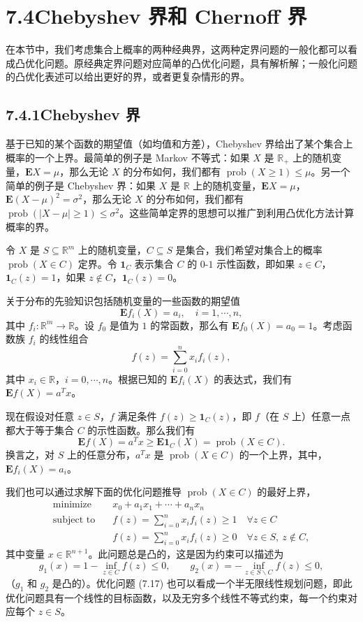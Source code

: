 \documentclass[UTF8,12pt,a4paper,fontset=fandol]{ctexart}
\begin{document}
\section*{7.4\quad Chebyshev 界和 Chernoff 界}

在本节中，我们考虑集合上概率的两种经典界，这两种定界问题的一般化都可以看成凸优化问题。原经典定界问题对应简单的凸优化问题，具有解析解；一般化问题的凸优化表述可以给出更好的界，或者更复杂情形的界。

\subsection*{7.4.1\quad Chebyshev 界}

基于已知的某个函数的期望值（如均值和方差），Chebyshev 界给出了某个集合上概率的一个上界。最简单的例子是 Markov 不等式：如果 $X$ 是 $\mathbb{R}_+$ 上的随机变量，$\mathbf{E}X=\mu$，那么无论 $X$ 的分布如何，我们都有 $\operatorname{prob}(X\geq 1)\leq \mu$。另一个简单的例子是 Chebyshev 界：如果 $X$ 是 $\mathbb{R}$ 上的随机变量，$\mathbf{E}X=\mu$，$\mathbf{E}(X-\mu)^2=\sigma^2$，那么无论 $X$ 的分布如何，我们都有 $\operatorname{prob}(|X-\mu|\geq 1)\leq\sigma^2$。这些简单定界的思想可以推广到利用凸优化方法计算概率的界。

令 $X$ 是 $S\subseteq\mathbb{R}^m$ 上的随机变量，$C\subseteq S$ 是集合，我们希望对集合上的概率 $\operatorname{prob}(X\in C)$ 定界。令 $\mathbf{1}_C$ 表示集合 $C$ 的 $0$-$1$ 示性函数，即如果 $z\in C$，$\mathbf{1}_C(z)=1$，如果 $z\notin C$，$\mathbf{1}_C(z)=0$。

关于分布的先验知识包括随机变量的一些函数的期望值
\[
\mathbf{E}f_i(X)=a_i,\quad i=1,\cdots,n,
\]
其中 $f_i:\mathbb{R}^m\to\mathbb{R}$。设 $f_0$ 是值为 $1$ 的常函数，那么有 $\mathbf{E}f_0(X)=a_0=1$。考虑函数族 $f_i$ 的线性组合
\[
f(z)=\sum_{i=0}^n x_if_i(z),
\]
其中 $x_i\in\mathbb{R}$，$i=0,\cdots,n$。根据已知的 $\mathbf{E}f_i(X)$ 的表达式，我们有 $\mathbf{E}f(X)=a^Tx$。

现在假设对任意 $z\in S$，$f$ 满足条件 $f(z)\geq \mathbf{1}_C(z)$，即 $f$（在 $S$ 上）任意一点都大于等于集合 $C$ 的示性函数。那么我们有
\[
\mathbf{E}f(X)=a^Tx\geq \mathbf{E}\mathbf{1}_C(X)=\operatorname{prob}(X\in C).
\]
换言之，对 $S$ 上的任意分布，$a^Tx$ 是 $\operatorname{prob}(X\in C)$ 的一个上界，其中，$\mathbf{E}f_i(X)=a_i$。

我们也可以通过求解下面的优化问题推导 $\operatorname{prob}(X\in C)$ 的最好上界，
\begin{equation}
\begin{aligned}
\text{minimize}\quad & x_0+a_1x_1+\cdots+a_nx_n\\
\text{subject to}\quad & f(z)=\sum_{i=0}^n x_if_i(z)\geq 1\quad \forall z\in C\\
& f(z)=\sum_{i=0}^n x_if_i(z)\geq 0\quad \forall z\in S,\ z\notin C,
\end{aligned}
\tag{7.17}
\end{equation}
其中变量 $x\in\mathbb{R}^{n+1}$。此问题总是凸的，这是因为约束可以描述为
\[
g_1(x)=1-\inf_{z\in C}f(z)\leq 0,\qquad
g_2(x)=-\inf_{z\in S\backslash C}f(z)\leq 0,
\]
（$g_1$ 和 $g_2$ 是凸的）。优化问题 (7.17) 也可以看成一个半无限线性规划问题，即此优化问题具有一个线性的目标函数，以及无穷多个线性不等式约束，每一个约束对应每个 $z\in S$。
\end{document}

